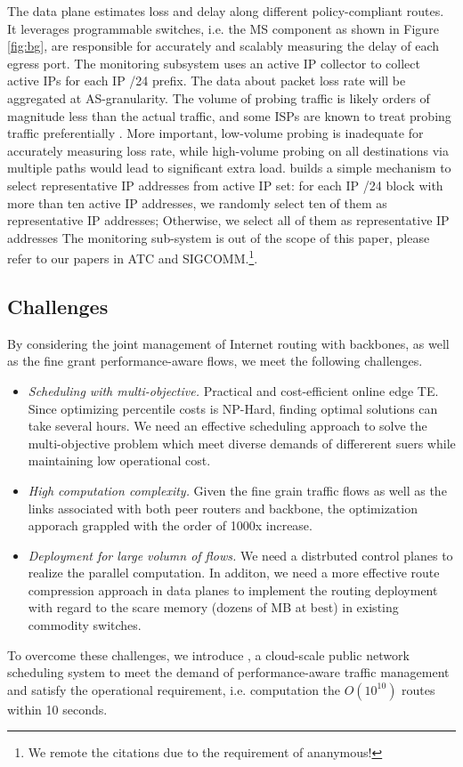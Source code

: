 The data plane estimates loss and delay along different policy-compliant routes. It leverages programmable switches, i.e. the MS component as shown in Figure \ref{fig:bg},  are responsible for accurately and scalably measuring the delay of each egress port.
The monitoring subsystem uses an active IP collector to collect active IPs for each IP /24 prefix. The data about packet loss rate will be aggregated at AS-granularity. The volume of probing traffic is likely orders of magnitude less than the actual traffic, and some ISPs are known to treat probing traffic preferentially \cite{zhang2010optimizingEntact, valancius2013PECAN, liu2016Footprint}. More important, low-volume probing is inadequate for accurately measuring loss rate, while high-volume probing on all destinations via multiple paths would lead to significant extra load. {\sys} builds a simple mechanism to select representative IP addresses from active IP set: for each IP /24 block with more than ten active IP addresses, we randomly select ten of them as representative IP addresses; Otherwise, we select all of them as representative IP addresses The monitoring sub-system is out of the scope of this paper, please refer to our papers in ATC and SIGCOMM.\footnote{We remote the citations due to the requirement of ananymous!}. 

\subsection{Challenges}
By considering the joint management of Internet routing with backbones, as well as the fine grant performance-aware flows, we meet the following challenges. 

\begin{itemize}[leftmargin=*] 
\item \textit{Scheduling with multi-objective.} Practical and cost-efficient online edge TE. Since optimizing percentile costs is NP-Hard, finding optimal solutions can take several hours. We need an effective scheduling approach to solve the multi-objective problem which meet diverse demands of differerent suers while maintaining low operational cost.  
\item \textit{High computation complexity.} Given the fine grain traffic flows as well as the links associated with both peer routers and backbone, the optimization apporach grappled with the order of 1000x increase. 
\item \textit{Deployment for large volumn of flows.} We need a distrbuted control planes to realize the parallel computation. In additon, we need a more effective route compression approach in data planes to implement the routing deployment with regard to the scare memory (dozens of MB at best) in existing commodity switches.
\end{itemize}

To overcome these challenges, we introduce {\sys}, a cloud-scale public network scheduling system to meet the demand of performance-aware traffic management and satisfy the operational requirement, i.e. computation the $O(10^{10})$ routes within 10 seconds.

